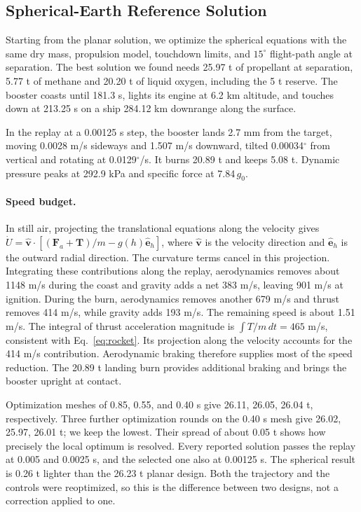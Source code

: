 
\subsection{Spherical-Earth Reference Solution}
\label{sec:spherical-results}
Starting from the planar solution, we optimize the spherical equations with the same dry mass, propulsion model, touchdown limits, and $15^\circ$ flight-path angle at separation. The best solution we found needs 25.97 t of propellant at separation, 5.77 t of methane and 20.20 t of liquid oxygen, including the 5 t reserve. The booster coasts until 181.3 s, lights its engine at 6.2 km altitude, and touches down at 213.25 s on a ship 284.12 km downrange along the surface.

In the replay at a 0.00125 s step, the booster lands 2.7 mm from the target, moving 0.0028 m/s sideways and 1.507 m/s downward, tilted 0.00034$^\circ$ from vertical and rotating at 0.0129$^\circ$/s. It burns 20.89 t and keeps 5.08 t. Dynamic pressure peaks at 292.9 kPa and specific force at 7.84$\,g_0$.

\paragraph{Speed budget.} In still air, projecting the translational equations along the velocity gives $\dot U=\hat{\mathbf v}\cdot[(\mathbf F_a+\mathbf T)/m-g(h)\hat{\mathbf e}_h]$, where $\hat{\mathbf v}$ is the velocity direction and $\hat{\mathbf e}_h$ is the outward radial direction. The curvature terms cancel in this projection. Integrating these contributions along the replay, aerodynamics removes about 1148 m/s during the coast and gravity adds a net 383 m/s, leaving 901 m/s at ignition. During the burn, aerodynamics removes another 679 m/s and thrust removes 414 m/s, while gravity adds 193 m/s. The remaining speed is about 1.51 m/s. The integral of thrust acceleration magnitude is $\int T/m\,dt=465$ m/s, consistent with Eq.~\eqref{eq:rocket}. Its projection along the velocity accounts for the 414 m/s contribution. Aerodynamic braking therefore supplies most of the speed reduction. The 20.89 t landing burn provides additional braking and brings the booster upright at contact.

Optimization meshes of 0.85, 0.55, and 0.40 s give 26.11, 26.05, 26.04 t, respectively. Three further optimization rounds on the 0.40 s mesh give 26.02, 25.97, 26.01 t; we keep the lowest. Their spread of about 0.05 t shows how precisely the local optimum is resolved. Every reported solution passes the replay at 0.005 and 0.0025 s, and the selected one also at 0.00125 s. The spherical result is 0.26 t lighter than the 26.23 t planar design. Both the trajectory and the controls were reoptimized, so this is the difference between two designs, not a correction applied to one.

